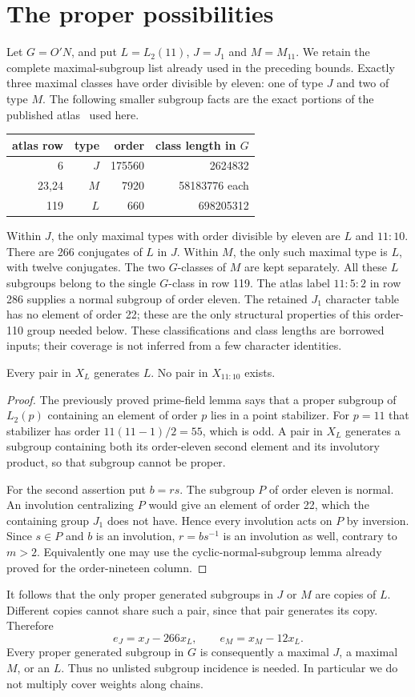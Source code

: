 \documentclass[11pt,a4paper]{article}
\begin{document}
\section{The proper possibilities}
Let $G=O'N$, and put $L=L_2(11)$, $J=J_1$ and $M=M_{11}$.
We retain the complete maximal-subgroup list already used in the
preceding bounds. Exactly three maximal classes have order divisible
by eleven: one of type $J$ and two of type $M$.
The following smaller subgroup facts are the exact portions of the
published atlas~\cite{atlas} used here.
\begin{center}\begin{tabular}{rrrr}\toprule
atlas row&type&order&class length in $G$\\\midrule
6&$J$&175560&2624832\\
23,24&$M$&7920&58183776 each\\
119&$L$&660&698205312\\\bottomrule
\end{tabular}\end{center}
Within $J$, the only maximal types with order divisible by eleven
are $L$ and $11:10$. There are 266 conjugates of $L$ in $J$.
Within $M$, the only such maximal type is $L$, with twelve conjugates.
The two $G$-classes of $M$ are kept separately.
All these $L$ subgroups belong to the single $G$-class in row 119.
The atlas label $11:5:2$ in row 286 supplies a normal subgroup
of order eleven. The retained $J_1$ character table has no element
of order 22; these are the only structural properties of this
order-110 group needed below.
These classifications and class lengths are borrowed inputs;
their coverage is not inferred from a few character identities.

\begin{lemma}\label{L}
Every pair in $X_L$ generates $L$. No pair in $X_{11:10}$ exists.
\end{lemma}
\begin{proof}
The previously proved prime-field lemma says that a proper subgroup
of $L_2(p)$ containing an element of order $p$ lies in a point
stabilizer. For $p=11$ that stabilizer has order $11(11-1)/2=55$,
which is odd. A pair in $X_L$ generates a subgroup containing both
its order-eleven second element and its involutory product, so that
subgroup cannot be proper.

For the second assertion put $b=rs$. The subgroup $P$ of order eleven
is normal. An involution centralizing $P$ would give an element of
order 22, which the containing group $J_1$ does not have. Hence
every involution acts on $P$ by inversion. Since $s\in P$ and $b$ is an involution,
$r=bs^{-1}$ is an involution as well, contrary to $m>2$.
Equivalently one may use the cyclic-normal-subgroup lemma already
proved for the order-nineteen column.
\end{proof}
It follows that the only proper generated subgroups in $J$ or $M$
are copies of $L$. Different copies cannot share such a pair, since
that pair generates its copy. Therefore
\[
 e_J=x_J-266x_L,\qquad e_M=x_M-12x_L. \tag{1}
\]
Every proper generated subgroup in $G$ is consequently a maximal
$J$, a maximal $M$, or an $L$. Thus no unlisted subgroup incidence is
needed. In particular we do not multiply cover weights along chains.
\end{document}
